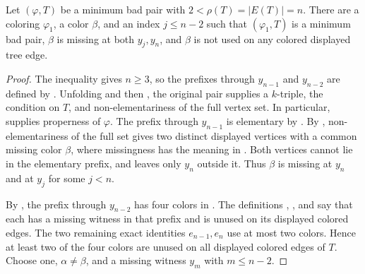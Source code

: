 \begin{helper}
Let \((\varphi,T)\) be a minimum bad pair with
\(2<\rho(T)=|E(T)|=n\).  There are a coloring \(\varphi_1\), a color
\(\beta\), and an index \(j\le n-2\) such that
\((\varphi_1,T)\) is a minimum bad pair, \(\beta\) is missing at both
\(y_j,y_n\), and \(\beta\) is not used on any colored displayed tree
edge.
\end{helper}
\begin{proof}
The inequality gives \(n\ge3\), so the prefixes through \(y_{n-1}\) and
\(y_{n-2}\) are defined by .  Unfolding
 and then , the
original pair supplies a \(k\)-triple, the 
condition on \(T\), and non-elementariness of the full vertex set.  In
particular,  supplies properness of \(\varphi\).  The
prefix through \(y_{n-1}\) is elementary by
.  By
, non-elementariness of the full set
gives two distinct displayed vertices with a common missing color
\(\beta\), where missingness has the meaning in
.  Both vertices cannot lie in the elementary
prefix, and  leaves only \(y_n\) outside it.
Thus \(\beta\) is missing at \(y_n\) and at \(y_j\) for some \(j<n\).

By , the prefix through \(y_{n-2}\)
has four colors in .  The definitions
, , and
 say that each has a missing witness in that
prefix and is unused on its displayed colored edges.  The two remaining
exact identities \(e_{n-1},e_n\) use at most two colors.  Hence at least
two of the four colors are unused on all displayed colored edges of
\(T\).  Choose one, \(\alpha\ne\beta\), and a missing witness \(y_m\)
with \(m\le n-2\).


\end{proof}

